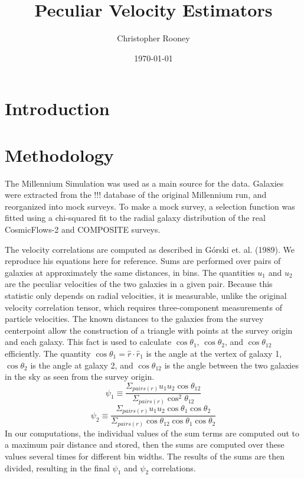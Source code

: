 \documentclass[usenatbib]{mn2e}
\begin{document}
\author{Christopher Rooney}
\date{\today}
\title{Peculiar Velocity Estimators}
\maketitle

\begin{abstract}

\end{abstract}

\section{Introduction}


\section{Methodology}
The Millennium Simulation was used as a main source for the data. Galaxies were extracted from the !!! database of the original Millennium run, and reorganized into mock surveys. To make a mock survey, a selection function was fitted using a chi-squared fit to the radial galaxy distribution of the real CosmicFlows-2 and COMPOSITE surveys.

The velocity correlations are computed as described in G\'orski et. al. (1989). We reproduce his equations here for reference. Sums are performed over pairs of galaxies at approximately the same distances, in bins. The quantities $u_1$ and $u_2$ are the peculiar velocities of the two galaxies in a given pair. Because this statistic only depends on radial velocities, it is measurable, unlike the original velocity correlation tensor, which requires three-component measurements of particle velocities. The known distances to the galaxies from the survey centerpoint allow the construction of a triangle with points at the survey origin and each galaxy. This fact is used to calculate $\cos\theta_1$, $\cos\theta_2$, and $\cos\theta_{12}$ efficiently. The quantity $\cos\theta_1 = \hat{r}\cdot\hat{r}_1$ is the angle at the vertex of galaxy 1, $\cos\theta_2$ is the angle at galaxy 2, and $\cos\theta_{12}$ is the angle between the two galaxies in the sky as seen from the survey origin. 
\begin{equation}
\psi_1 \equiv \frac{\Sigma_{pairs(r)}u_1u_2\cos\theta_{12}}{\Sigma_{pairs(r)}\cos^2\theta_{12}}
\end{equation}
\begin{equation}
\psi_2 \equiv \frac{\Sigma_{pairs(r)}u_1u_2\cos\theta_{1}\cos\theta_2}{\Sigma_{pairs(r)}\cos\theta_{12}\cos\theta_1\cos\theta_2}
\end{equation}
In our computations, the individual values of the sum terms are computed out to a maximum pair distance and stored, then the sums are computed over these values several times for different bin widths. The results of the sums are then divided, resulting in the final $\psi_1$ and $\psi_2$ correlations.
\end{document}

